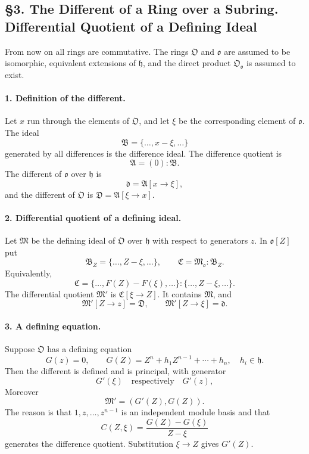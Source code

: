 \documentclass[11pt]{article}
\begin{document}
\subsection*{§3. The Different of a Ring over a Subring. Differential Quotient of a Defining Ideal}

From now on all rings are commutative. The rings $\mathfrak O$ and $\mathfrak o$ are assumed to be isomorphic, equivalent extensions of $\mathfrak h$, and the direct product $\mathfrak O_{\mathfrak o}$ is assumed to exist.

\paragraph{1. Definition of the different.}
Let $x$ run through the elements of $\mathfrak O$, and let $\xi$ be the corresponding element of $\mathfrak o$. The ideal
\[
        \mathfrak B=\{\ldots,x-\xi,\ldots\}
\]
generated by all differences is the difference ideal. The difference quotient is
\[
        \mathfrak A=(0):\mathfrak B.
\]
The different of $\mathfrak o$ over $\mathfrak h$ is
\[
        \mathfrak d=\mathfrak A[x\to\xi],
\]
and the different of $\mathfrak O$ is $\mathfrak D=\mathfrak A[\xi\to x]$.

\paragraph{2. Differential quotient of a defining ideal.}
Let $\mathfrak M$ be the defining ideal of $\mathfrak O$ over $\mathfrak h$ with respect to generators $z$. In $\mathfrak o[Z]$ put
\[
        \mathfrak B_Z=\{\ldots,Z-\xi,\ldots\},
        \qquad
        \mathfrak C=\mathfrak M_{\mathfrak o}:\mathfrak B_Z.
\]
Equivalently,
\[
        \mathfrak C=\{\ldots,F(Z)-F(\xi),\ldots\}:\{\ldots,Z-\xi,\ldots\}.
\]
The differential quotient $\mathfrak M'$ is $\mathfrak C[\xi\to Z]$. It contains $\mathfrak M$, and
\[
        \mathfrak M'[Z\to z]=\mathfrak D,
        \qquad
        \mathfrak M'[Z\to\xi]=\mathfrak d.
\]

\paragraph{3. A defining equation.}
Suppose $\mathfrak O$ has a defining equation
\[
        G(z)=0,
        \qquad
        G(Z)=Z^n+h_1Z^{n-1}+\cdots+h_n,
        \quad h_i\in\mathfrak h.
\]
Then the different is defined and is principal, with generator
\[
        G'(\xi) \quad\text{respectively}\quad G'(z),
\]
Moreover
\[
        \mathfrak M'=(G'(Z),G(Z)).
\]
The reason is that $1,z,\ldots,z^{n-1}$ is an independent module basis and that
\[
        C(Z,\xi)=\frac{G(Z)-G(\xi)}{Z-\xi}
\]
generates the difference quotient. Substitution $\xi\to Z$ gives $G'(Z)$.
\end{document}
